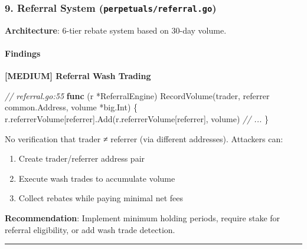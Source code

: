\documentclass[
]{article}
\newenvironment{Shaded}{}{}
\newcommand{\CommentTok}[1]{\textcolor[rgb]{0.38,0.63,0.69}{\textit{#1}}}
\newcommand{\KeywordTok}[1]{\textcolor[rgb]{0.00,0.44,0.13}{\textbf{#1}}}
\newcommand{\NormalTok}[1]{#1}
\newcommand{\OperatorTok}[1]{\textcolor[rgb]{0.40,0.40,0.40}{#1}}
\providecommand{\tightlist}{%
  \setlength{\itemsep}{0pt}\setlength{\parskip}{0pt}}
\begin{document}
\subsubsection{\texorpdfstring{9. Referral System
(\texttt{perpetuals/referral.go})}{9. Referral System (perpetuals/referral.go)}}\label{9-referral-system-perpetualsreferralgo}

\textbf{Architecture}: 6-tier rebate system based on 30-day volume.

\paragraph{Findings}\label{findings-8}

\textbf{{[}MEDIUM{]} Referral Wash Trading}

\begin{Shaded}
\begin{Highlighting}[]
\CommentTok{// referral.go:55}
\KeywordTok{func} \OperatorTok{(}\NormalTok{r }\OperatorTok{*}\NormalTok{ReferralEngine}\OperatorTok{)}\NormalTok{ RecordVolume}\OperatorTok{(}\NormalTok{trader}\OperatorTok{,}\NormalTok{ referrer common}\OperatorTok{.}\NormalTok{Address}\OperatorTok{,}\NormalTok{ volume }\OperatorTok{*}\NormalTok{big}\OperatorTok{.}\NormalTok{Int}\OperatorTok{)} \OperatorTok{\{}
\NormalTok{    r}\OperatorTok{.}\NormalTok{referrerVolume}\OperatorTok{[}\NormalTok{referrer}\OperatorTok{].}\NormalTok{Add}\OperatorTok{(}\NormalTok{r}\OperatorTok{.}\NormalTok{referrerVolume}\OperatorTok{[}\NormalTok{referrer}\OperatorTok{],}\NormalTok{ volume}\OperatorTok{)}
    \CommentTok{// ...}
\OperatorTok{\}}
\end{Highlighting}
\end{Shaded}

No verification that trader ≠ referrer (via different addresses).
Attackers can:

\begin{enumerate}
\def\labelenumi{\arabic{enumi}.}
\tightlist
\item
  Create trader/referrer address pair
\item
  Execute wash trades to accumulate volume
\item
  Collect rebates while paying minimal net fees
\end{enumerate}

\textbf{Recommendation}: Implement minimum holding periods, require
stake for referral eligibility, or add wash trade detection.

\begin{center}\rule{0.5\linewidth}{0.5pt}\end{center}
\end{document}
